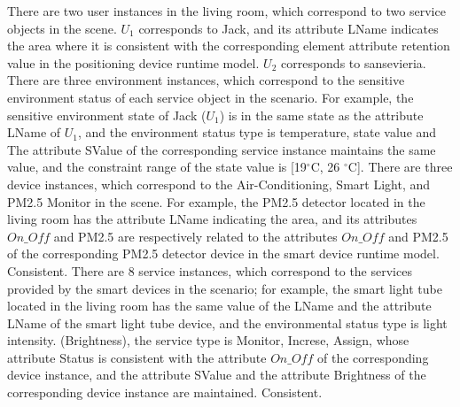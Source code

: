 There are two user instances in the living room, which correspond to two service objects in the scene. $U_{1}$ corresponds to Jack, and its attribute LName indicates the area where it is consistent with the corresponding element attribute retention value in the positioning device runtime model. $U_{2}$ corresponds to sansevieria. There are three environment instances, which correspond to the sensitive environment status of each service object in the scenario. For example, the sensitive environment state of Jack ($U_{1}$) is in the same state as the attribute LName of $U_{1}$, and the environment status type is temperature, state value and The attribute SValue of the corresponding service instance maintains the same value, and the constraint range of the state value is [19$^{\circ}$C, 26 $^{\circ}$C]. There are three device instances, which correspond to the Air-Conditioning, Smart Light, and PM2.5 Monitor in the scene. For example, the PM2.5 detector located in the living room has the attribute LName indicating the area, and its attributes $On\_Off$ and PM2.5 are respectively related to the attributes $On\_Off$ and PM2.5 of the corresponding PM2.5 detector device in the smart device runtime model. Consistent. There are 8 service instances, which correspond to the services provided by the smart devices in the scenario; for example, the smart light tube located in the living room has the same value of the LName and the attribute LName of the smart light tube device, and the environmental status type is light intensity. (Brightness), the service type is Monitor, Increse, Assign, whose attribute Status is consistent with the attribute $On\_Off$ of the corresponding device instance, and the attribute SValue and the attribute Brightness of the corresponding device instance are maintained. Consistent.
